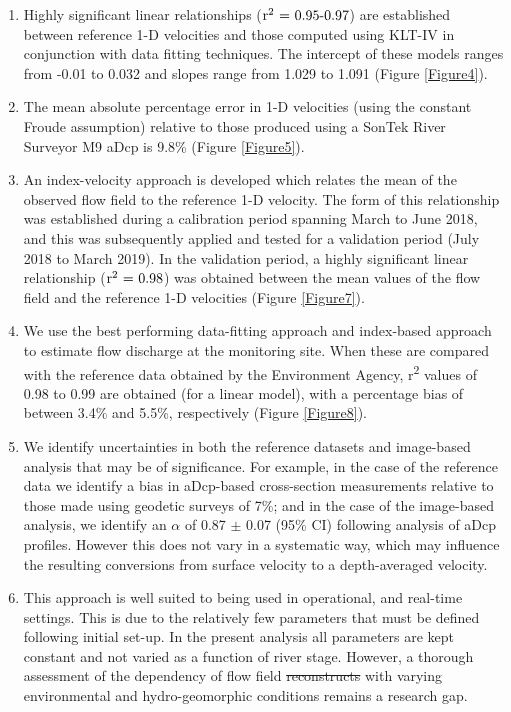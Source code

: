 \documentclass[hess, manuscript]{copernicus} %
\providecommand{\DIFadd}[1]{{\protect\color{blue}\uwave{#1}}} %
\providecommand{\DIFdel}[1]{{\protect\color{red}\sout{#1}}} %
\providecommand{\DIFaddbegin}{} %
\providecommand{\DIFaddend}{} %
\providecommand{\DIFdelbegin}{} %
\providecommand{\DIFdelend}{} %
\newcommand{\DIFscaledelfig}{0.5}
\newlength{\DIFdelgraphicswidth} %
\newlength{\DIFdelgraphicsheight} %
\newcommand{\DIFaddincludegraphics}[2][]{{\color{blue}\fbox{\DIFOincludegraphics[#1]{#2}}}} %
\newcommand{\DIFdelincludegraphics}[2][]{%
\sbox{\DIFdelgraphicsbox}{\DIFOincludegraphics[#1]{#2}}%
\settoboxwidth{\DIFdelgraphicswidth}{\DIFdelgraphicsbox} %
\settoboxtotalheight{\DIFdelgraphicsheight}{\DIFdelgraphicsbox} %
\scalebox{\DIFscaledelfig}{%
\parbox[b]{\DIFdelgraphicswidth}{\usebox{\DIFdelgraphicsbox}\\[-\baselineskip] \rule{\DIFdelgraphicswidth}{0em}}\llap{\resizebox{\DIFdelgraphicswidth}{\DIFdelgraphicsheight}{%
\setlength{\unitlength}{\DIFdelgraphicswidth}%
\begin{picture}(1,1)%
\thicklines\linethickness{2pt} %
{\color[rgb]{1,0,0}\put(0,0){\framebox(1,1){}}}%
{\color[rgb]{1,0,0}\put(0,0){\line( 1,1){1}}}%
{\color[rgb]{1,0,0}\put(0,1){\line(1,-1){1}}}%
\end{picture}%
}\hspace*{3pt}}} %
} %
\DeclareRobustCommand{\DIFaddbegin}{\DIFOaddbegin \let\includegraphics\DIFaddincludegraphics} %
\DeclareRobustCommand{\DIFaddend}{\DIFOaddend \let\includegraphics\DIFOincludegraphics} %
\DeclareRobustCommand{\DIFdelbegin}{\DIFOdelbegin \let\includegraphics\DIFdelincludegraphics} %
\DeclareRobustCommand{\DIFdelend}{\DIFOaddend \let\includegraphics\DIFOincludegraphics} %
\begin{document}
\begin{enumerate}
    \item Highly significant linear relationships (${\textnormal{r\textsuperscript{2} = 0.95-0.97}}$) are established between reference 1-D velocities and those computed using KLT-IV in conjunction with data fitting techniques. The intercept of these models ranges from -0.01 to 0.032 and slopes range from 1.029 to 1.091 (Figure \ref{Figure4}). 
    \item The mean absolute percentage error in 1-D velocities (using the constant Froude \DIFaddbegin \DIFadd{number }\DIFaddend assumption) relative to those produced using a SonTek River Surveyor M9 aDcp is 9.8\% (Figure \ref{Figure5}).    
    \item An index-velocity approach is developed which relates the mean of the observed flow field to the reference 1-D velocity. The form of this relationship was established during a calibration period spanning March to June 2018, and this was subsequently applied and tested for a validation period (July 2018 to March 2019). In the validation period, a highly significant linear relationship (${\textnormal{r\textsuperscript{2} = 0.98}}$) was obtained between the mean values of the flow field and the reference 1-D velocities (Figure \ref{Figure7}).
    \item We use the best performing data-fitting approach and index-based approach to estimate flow discharge at the monitoring site. When these are compared with the reference data obtained by the Environment Agency, r\textsuperscript{2} values of 0.98 to 0.99 are obtained (for a linear model), with a percentage bias of between 3.4\% and 5.5\%, respectively (Figure \ref{Figure8}).
    \item We identify uncertainties in both the reference datasets and image-based analysis that may be of significance. For example, in the case of the reference data we identify a bias in aDcp-based cross-section measurements relative to those made using geodetic surveys of 7\%; and in the case of the image-based analysis, we identify an $\alpha$ of 0.87 $\pm$ 0.07 (95\% CI) following analysis of aDcp profiles. However this does not vary in a systematic way, which may influence the resulting conversions from surface velocity to a depth-averaged velocity. 
    \item This approach is well suited to being used in operational, and real-time settings. This is due to the relatively few parameters that must be defined following initial set-up. In the present analysis all parameters are kept constant and not varied as a function of river stage. However, a thorough assessment of the dependency of flow field \DIFdelbegin \DIFdel{reconstructs }\DIFdelend \DIFaddbegin \DIFadd{reconstructions }\DIFaddend with varying environmental and hydro-geomorphic conditions remains a research gap. 
\end{enumerate}
\end{document}
